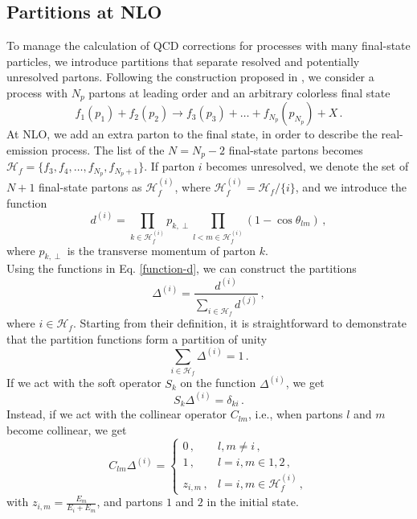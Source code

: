 \documentclass[a4paper, 12pt]{book}
\begin{document}
\begin{appendices}
\section{Partitions at NLO}
\label{partition-damping}
To manage the calculation of QCD corrections for processes with many final-state particles, we introduce partitions that separate resolved and potentially unresolved partons. Following the construction proposed in \cite{Devoto:2023rpv}, we consider a process with $N_p$ partons at leading order and an arbitrary colorless final state
\begin{equation}
  f_1(p_1)+f_2(p_2) \to f_3(p_3) + \dots + f_{N_p}(p_{N_p})+X \, .
\end{equation}
At NLO, we add an extra parton to the final state, in order to describe the real-emission process. The list of the $N=N_p-2$ final-state partons becomes $\mathcal{H}_{f}=\{f_3,f_4, \dots, f_{N_p},f_{N_p+1}\}$. If parton $i$ becomes unresolved, we denote the set of $N+1$ final-state partons as $\mathcal{H}^{(i)}_f$, where $\mathcal{H}^{(i)}_f= \mathcal{H}_{f} \slash \{i\}$, and we introduce the function
\begin{equation}
  d^{(i)}= \prod_{k \in \mathcal{H}_{f}^{(i)}} p_{k,\perp} \prod_{l < m \in \mathcal{H}_f^{(i)}} (1 - \cos{\theta_{lm}}) \, ,
  \label{function-d}
\end{equation}
where $p_{k,\perp}$ is the transverse momentum of parton $k$. \\
Using the functions in Eq. \ref{function-d}, we can construct the partitions
\begin{equation}
  \Delta^{(i)}= \frac{d^{(i)}}{\sum_{i\in \mathcal{H}_f}d^{(j)}}  \, ,
  \label{delta-partition}
\end{equation}
where $i \in \mathcal{H}_f$. Starting from their definition, it is straightforward to demonstrate that the partition functions form a partition of unity
\begin{equation}
  \sum_{i \in \mathcal{H}_f} \Delta^{(i)}=1 \, .
\end{equation}
If we act with the soft operator $S_k$ on the function $\Delta^{(i)}$, we get
\begin{equation}
  S_k \Delta^{(i)} = \delta_{ki} \, .
\end{equation}
Instead, if we act with the collinear operator $C_{lm}$, i.e., when partons $l$ and $m$ become collinear, we get
\begin{equation}
  C_{lm}\Delta^{(i)}=  \begin{cases}
    0 \, , & l,m \neq i \,, \\
    1 \,, & l=i, m \in{1,2} \,, \\
    z_{i,m}\, ,& l=i, m \in \mathcal{H}_f^{(i)} \,,
  \end{cases}
\end{equation}
with $z_{i,m}= \frac{E_m}{E_i+E_m}$, and partons $1$ and $2$ in the initial state.


\end{appendices}
\end{document}

